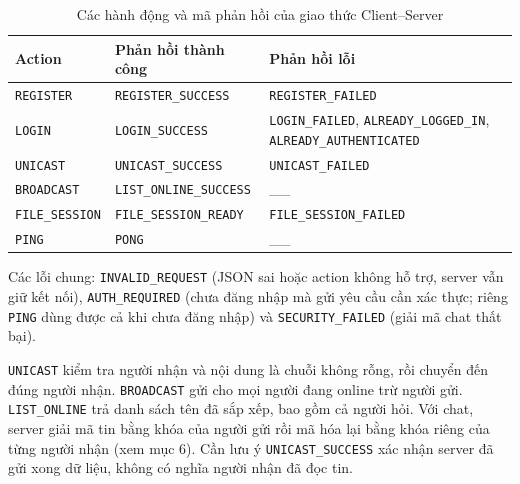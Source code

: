\begin{table}[H]
    \centering
    \small

    \renewcommand{\arraystretch}{1.3}

    \begin{tabularx}{\textwidth}{
        @{}
        >{\raggedright\arraybackslash}p{2.5cm}
        >{\raggedright\arraybackslash}X
        >{\raggedright\arraybackslash}X
        @{}
    }
        \toprule
        \textbf{Action} & \textbf{Phản hồi thành công} & \textbf{Phản hồi lỗi} \\
        \midrule

        \texttt{REGISTER}
        & \texttt{REGISTER\_SUCCESS}
        & \texttt{REGISTER\_FAILED} \\

        \texttt{LOGIN}
        & \texttt{LOGIN\_SUCCESS}
        & \texttt{LOGIN\_FAILED}, \texttt{ALREADY\_LOGGED\_IN}, \texttt{ALREADY\_AUTHENTICATED} \\

        \texttt{UNICAST}
        & \texttt{UNICAST\_SUCCESS}
        & \texttt{UNICAST\_FAILED} \\

        \texttt{BROADCAST}
        & \texttt{LIST\_ONLINE\_SUCCESS}
        & \_\_ \\

        \texttt{FILE\_SESSION}
        & \texttt{FILE\_SESSION\_READY}
        & \texttt{FILE\_SESSION\_FAILED} \\

        \texttt{PING}
        & \texttt{PONG}
        & \_\_ \\

        \bottomrule
    \end{tabularx}
    \caption{Các hành động và mã phản hồi của giao thức Client--Server}
\end{table}


Các lỗi chung: \texttt{INVALID\_REQUEST} (JSON sai hoặc action không hỗ trợ, server vẫn giữ kết nối), \texttt{AUTH\_REQUIRED} (chưa đăng nhập mà gửi yêu cầu cần xác thực; riêng \texttt{PING} dùng được cả khi chưa đăng nhập) và \texttt{SECURITY\_FAILED} (giải mã chat thất bại).

\texttt{UNICAST} kiểm tra người nhận và nội dung là chuỗi không rỗng, rồi chuyển đến đúng người nhận. \texttt{BROADCAST} gửi cho mọi người đang online trừ người gửi. \texttt{LIST\_ONLINE} trả danh sách tên đã sắp xếp, bao gồm cả người hỏi. Với chat, server giải mã tin bằng khóa của người gửi rồi mã hóa lại bằng khóa riêng của từng người nhận (xem mục 6). Cần lưu ý \texttt{UNICAST\_SUCCESS} xác nhận server đã gửi xong dữ liệu, không có nghĩa người nhận đã đọc tin.

